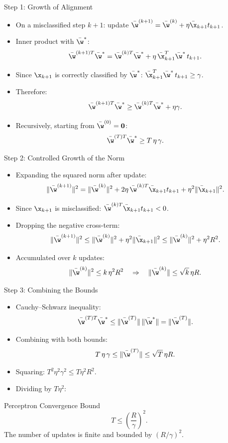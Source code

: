 \begin{frame}{Step 1: Growth of Alignment}
  \begin{itemize}
    \item On a misclassified step $k+1$: update $\bar{\w}^{(k+1)} = \bar{\w}^{(k)} + \eta\bar{\x}_{k+1}t_{k+1}$.
    \item Inner product with $\bar{\w}^*$:
    \[
      \bar{\w}^{(k+1)T}\bar{\w}^* = \bar{\w}^{(k)T}\bar{\w}^* + \eta\,\bar{\x}_{k+1}^T\bar{\w}^*\,t_{k+1}.
    \]
    \item Since $\x_{k+1}$ is correctly classified by $\bar{\w}^*$: $\bar{\x}_{k+1}^T\bar{\w}^*\,t_{k+1} \ge \gamma$.
    \item Therefore:
    \[
      \bar{\w}^{(k+1)T}\bar{\w}^* \ge \bar{\w}^{(k)T}\bar{\w}^* + \eta\gamma.
    \]
    \item Recursively, starting from $\bar{\w}^{(0)} = \mathbf{0}$:
    \[
      \bar{\w}^{(T)T}\bar{\w}^* \ge T\,\eta\,\gamma.
    \]
  \end{itemize}
\end{frame}

\begin{frame}{Step 2: Controlled Growth of the Norm}
  \begin{itemize}
    \item Expanding the squared norm after update:
    \[
      \|\bar{\w}^{(k+1)}\|^2 = \|\bar{\w}^{(k)}\|^2 + 2\eta\,\bar{\w}^{(k)T}\bar{\x}_{k+1}t_{k+1} + \eta^2\|\bar{\x}_{k+1}\|^2.
    \]
    \item Since $\x_{k+1}$ is \alert{misclassified}: $\bar{\w}^{(k)T}\bar{\x}_{k+1}t_{k+1} < 0$.
    \item Dropping the negative cross-term:
    \[
      \|\bar{\w}^{(k+1)}\|^2 \le \|\bar{\w}^{(k)}\|^2 + \eta^2\|\bar{\x}_{k+1}\|^2 \le \|\bar{\w}^{(k)}\|^2 + \eta^2 R^2.
    \]
    \item Accumulated over $k$ updates:
    \[
      \|\bar{\w}^{(k)}\|^2 \le k\,\eta^2 R^2 \quad \Rightarrow \quad \|\bar{\w}^{(k)}\| \le \sqrt{k}\,\eta R.
    \]
  \end{itemize}
\end{frame}

\begin{frame}{Step 3: Combining the Bounds}
  \begin{itemize}
    \item Cauchy--Schwarz inequality:
    \[
      \bar{\w}^{(T)T}\bar{\w}^* \le \|\bar{\w}^{(T)}\|\,\|\bar{\w}^*\| = \|\bar{\w}^{(T)}\|.
    \]
    \item Combining with both bounds:
    \[
      T\,\eta\,\gamma \le \|\bar{\w}^{(T)}\| \le \sqrt{T}\,\eta R.
    \]
    \item Squaring: $T^2\eta^2\gamma^2 \le T\eta^2 R^2$.
    \item Dividing by $T\eta^2$:
  \end{itemize}
  \begin{block}{Perceptron Convergence Bound}
    \[
      T \le \left(\frac{R}{\gamma}\right)^2.
    \]
    The number of updates is \alert{finite} and bounded by $(R/\gamma)^2$.
  \end{block}
\end{frame}

